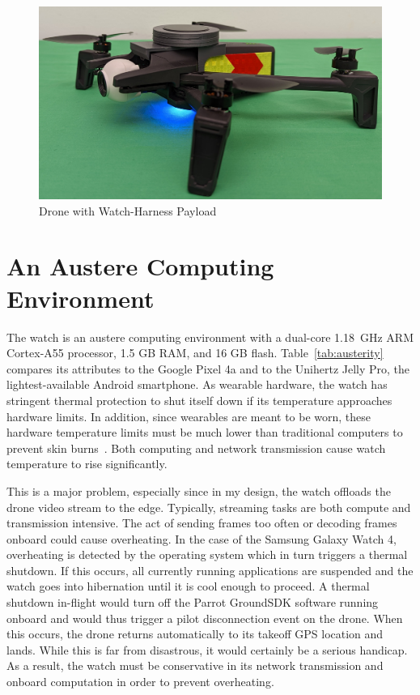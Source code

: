 \begin{figure}
    \centering
    \includegraphics[width=0.6\linewidth]{chapter3/FIGS/drone-watch-combo.jpg}
    \caption{Drone with Watch-Harness Payload}
    \label{fig:harness}
\end{figure}

\section{An Austere Computing Environment}
\label{sec:austere-computing}
The watch is an austere computing environment with a dual-core
1.18~GHz ARM Cortex-A55 processor, 1.5 GB RAM, and 16 GB flash.
Table~\ref{tab:austerity} compares its attributes to the Google Pixel 4a and to the Unihertz Jelly Pro, the lightest-available Android smartphone. As wearable hardware, the watch has stringent thermal protection to shut itself down if its temperature approaches hardware limits. In addition, since wearables are meant to be worn, these hardware temperature limits must be much lower than traditional computers to prevent skin burns~\cite{Hepokoski2021}. Both computing and network transmission cause watch temperature to rise significantly.

This is a major problem, especially since in my design, the watch offloads the drone video stream to the edge. Typically, streaming tasks are both compute and transmission intensive. The act of sending frames too often or decoding frames onboard could cause overheating. In the case of the Samsung Galaxy Watch 4, overheating is detected by the operating system which in turn triggers a thermal shutdown. If this occurs, all currently running applications are suspended and the watch goes into hibernation until it is cool enough to proceed. A thermal shutdown in-flight would turn off the Parrot GroundSDK software running onboard and would thus trigger a pilot disconnection event on the drone. When this occurs, the drone returns automatically to its takeoff GPS location and lands. While this is far from disastrous, it would certainly be a serious handicap. As a result, the watch must be conservative in its network transmission and onboard computation in order to prevent overheating.

